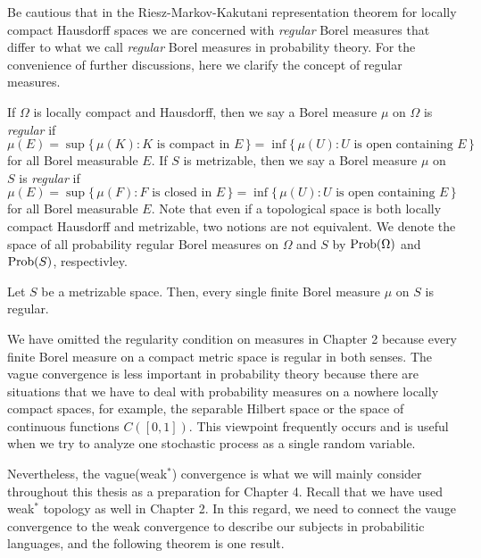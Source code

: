 \documentclass[a4paper]{article}
\begin{document}
Be cautious that in the Riesz-Markov-Kakutani representation theorem for locally compact Hausdorff spaces we are concerned with \emph{regular} Borel measures that differ to what we call \emph{regular} Borel measures in probability theory.
For the convenience of further discussions, here we clarify the concept of regular measures.

\begin{defn}
If $\Omega$ is locally compact and Hausdorff, then we say a Borel measure $\mu$ on $\Omega$ is \emph{regular} if
\[\mu(E)=\sup\{\,\mu(K):K\text{ is compact in }E\,\}
=\inf\{\,\mu(U):U\text{ is open containing }E\,\}\]
for all Borel measurable $E$.
If $S$ is metrizable, then we say a Borel measure $\mu$ on $S$ is \emph{regular} if
\[\mu(E)=\sup\{\,\mu(F):F\text{ is closed in }E\,\}
=\inf\{\,\mu(U):U\text{ is open containing }E\,\}\]
for all Borel measurable $E$.
Note that even if a topological space is both locally compact Hausdorff and metrizable, two notions are not equivalent.
We denote the space of all probability regular Borel measures on $\Omega$ and $S$ by $\operatorname{Prob}(\Omega)$ and $\operatorname{Prob}(S)$, respectivley.
\end{defn}

\begin{lem}
Let $S$ be a metrizable space.
Then, every single finite Borel measure $\mu$ on $S$ is regular.
\end{lem}

\begin{ex}

\end{ex}

We have omitted the regularity condition on measures in Chapter 2 because every finite Borel measure on a compact metric space is regular in both senses.
The vague convergence is less important in probability theory because there are situations that we have to deal with probability measures on a nowhere locally compact spaces, for example, the separable Hilbert space or the space of continuous functions $C([0,1])$.
This viewpoint frequently occurs and is useful when we try to analyze one stochastic process as a single random variable.

Nevertheless, the vague(weak$^*$) convergence is what we will mainly consider throughout this thesis as a preparation for Chapter 4.
Recall that we have used weak$^*$ topology as well in Chapter 2.
In this regard, we need to connect the vauge convergence to the weak convergence to describe our subjects in probabilitic languages, and the following theorem is one result.
\end{document}
